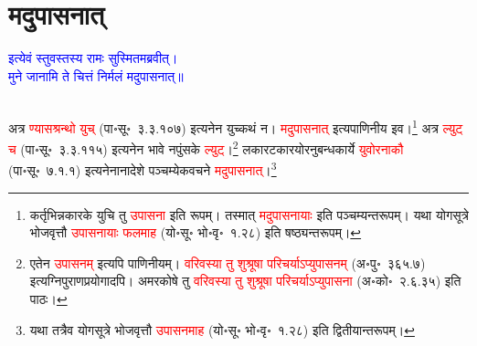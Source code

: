 \section[मदुपासनात्]{मदुपासनात्}
\centering\textcolor{blue}{इत्येवं स्तुवस्तस्य रामः सुस्मितमब्रवीत्।\nopagebreak\\
मुने जानामि ते चित्तं निर्मलं मदुपासनात्॥}\nopagebreak\\
\\
\begin{sloppypar}\justifying\noindent\hspace{10mm} अत्र \textcolor{red}{ण्यास\-श्रन्थो युच्} (पा॰सू॰~३.३.१०७) इत्यनेन युच्कथं न। \textcolor{red}{मदुपासनात्} इत्यपाणिनीय इव।\footnote{कर्तृभिन्न\-कारके युचि तु \textcolor{red}{उपासना} इति रूपम्। तस्मात् \textcolor{red}{मदुपासनायाः} इति पञ्चम्यन्त\-रूपम्। यथा योगसूत्रे भोज\-वृत्तौ \textcolor{red}{उपासनायाः फलमाह} (यो॰सू॰ भो॰वृ॰~१.२८) इति षष्ठ्यन्त\-रूपम्।} अत्र \textcolor{red}{ल्युट् च} (पा॰सू॰~३.३.११५) इत्यनेन भावे नपुंसके \textcolor{red}{ल्युट्}।\footnote{एतेन \textcolor{red}{उपासनम्} इत्यपि पाणिनीयम्। \textcolor{red}{वरिवस्या तु शुश्रूषा परिचर्याऽप्युपासनम्} (अ॰पु॰~३६५.७) इत्यग्नि\-पुराण\-प्रयोगादपि। अमरकोषे तु \textcolor{red}{वरिवस्या तु शुश्रूषा परिचर्याऽप्युपासना} (अ॰को॰~२.६.३५) इति पाठः।} लकार\-टकारयोरनुबन्ध\-कार्ये \textcolor{red}{युवोरनाकौ} (पा॰सू॰~७.१.१) इत्यनेनानादेशे पञ्चम्येक\-वचने \textcolor{red}{मदुपासनात्}।\footnote{यथा तत्रैव योगसूत्रे भोज\-वृत्तौ \textcolor{red}{उपासनमाह} (यो॰सू॰ भो॰वृ॰~१.२८) इति द्वितीयान्त\-रूपम्।}\end{sloppypar}
